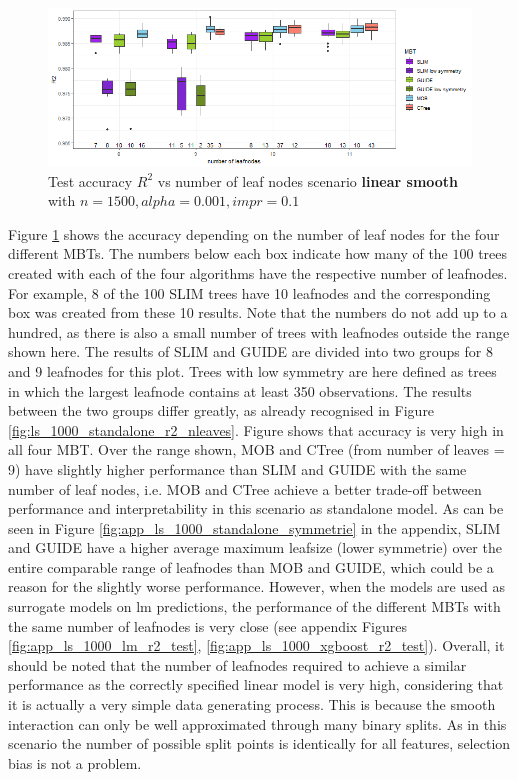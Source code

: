 \begin{figure}[!htb] 
\centering
    \includegraphics[width=16cm]{Figures/simulations/batchtools/basic_scenarios/linear_smooth/ls_1000_standalone_r2_test.png}
    \caption{Test accuracy $R^2$ vs number of leaf nodes scenario \textbf{linear smooth} with $n=1500, alpha = 0.001, impr = 0.1$}
    \label{fig:ls_1000_standalone_r2_test}
\end{figure} 

Figure \ref{fig:ls_1000_standalone_r2_test} shows the accuracy depending on the number of leaf nodes for the four different MBTs.
The numbers below each box indicate how many of the $100$ trees created with each of the four algorithms have the respective number of leafnodes. For example, 8 of the 100 SLIM trees have 10 leafnodes and the corresponding box was created from these 10 results. Note that the numbers do not add up to a hundred, as there is also a small number of trees with leafnodes outside the range shown here. The results of SLIM and GUIDE are divided into two groups for 8 and 9 leafnodes for this plot. Trees with low symmetry are here defined as trees in which the largest leafnode contains at least 350 observations. The results between the two groups differ greatly, as already recognised in Figure \ref{fig:ls_1000_standalone_r2_nleaves}.
Figure shows that accuracy is very high in all four MBT. Over the range shown, MOB and CTree (from number of leaves = 9) have slightly higher performance than SLIM and GUIDE with the same number of leaf nodes, i.e. MOB and CTree achieve a better trade-off between performance and interpretability in this scenario as standalone model.
As can be seen in Figure \ref{fig:app_ls_1000_standalone_symmetrie} in the appendix, SLIM and GUIDE have a higher average maximum leafsize (lower symmetrie) over the entire comparable range of leafnodes than MOB and GUIDE, which could be a reason for the slightly worse performance.
However, when the models are used as surrogate models on lm predictions, the performance of the different MBTs with the same number of leafnodes is very close (see appendix Figures \ref{fig:app_ls_1000_lm_r2_test}, \ref{fig:app_ls_1000_xgboost_r2_test}).
Overall, it should  be noted that the number of leafnodes required to achieve a similar performance as the correctly specified linear model is very high, considering that it is actually a very simple data generating process. This is because the smooth interaction can only be well approximated through many binary splits. 
As in this scenario the number of possible split points is identically for all features, selection bias is not a problem.






